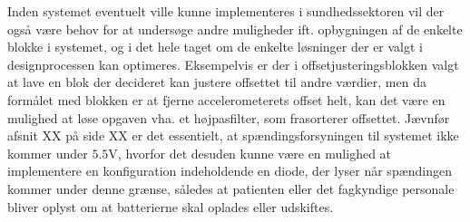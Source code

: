 \noindent Inden systemet eventuelt ville kunne implementeres i sundhedssektoren vil der også være behov for at undersøge andre muligheder ift. opbygningen af de enkelte blokke i systemet, og i det hele taget om de enkelte løsninger der er valgt i designprocessen kan optimeres. Eksempelvis er der i offsetjusteringsblokken valgt at lave en blok der decideret kan justere offsettet til andre værdier, men da formålet med blokken er at fjerne accelerometerets offset helt, kan det være en mulighed at løse opgaven vha. et højpasfilter, som frasorterer offsettet. Jævnfør afsnit XX på side XX er det essentielt, at spændingsforsyningen til systemet ikke kommer under $5.5$V, hvorfor det desuden kunne være en mulighed at implementere en konfiguration indeholdende en diode, der lyser når spændingen kommer under denne grænse, således at patienten eller det fagkyndige personale bliver oplyst om at batterierne skal oplades eller udskiftes. 
  
 
 